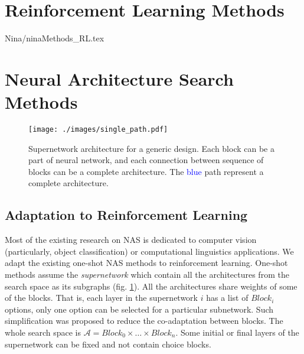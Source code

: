 \documentclass{svproc}
\begin{document}
\section{Reinforcement Learning Methods}
{Nina/ninaMethods_RL.tex}

\section{Neural Architecture Search Methods}

\begin{figure}
 \centering 
 \texttt{[image: ./images/single\_path.pdf]}
  \caption{Supernetwork architecture for a generic design. Each block can be a part of neural network, and each connection between sequence of blocks can be a complete architecture. The \textcolor{blue}{blue} path represent a complete architecture.
  }
  \label{fig:supernet_single}
\end{figure}

\subsection{Adaptation to Reinforcement Learning}
\label{sec:adapation}
Most of the existing research on NAS is dedicated to computer vision (particularly, object classification) or computational linguistics applications. We adapt the existing one-shot NAS methods to reinforcement learning. One-shot methods assume the \textit{supernetwork} which contain all the architectures from the search space as its subgraphs (fig. \ref{fig:supernet_single}). All the architectures share weights of some of the blocks. 
That is, each layer in the supernetwork $i$ has a list of $Block_{i}$ options, only one option can be selected for a particular subnetwork. Such simplification was proposed to reduce the co-adaptation between blocks. The whole search space is $\mathcal{A} = Block_0 \times \ldots \times Block_n$. Some initial or final layers of the supernetwork can be fixed and not contain choice blocks.
\end{document}
